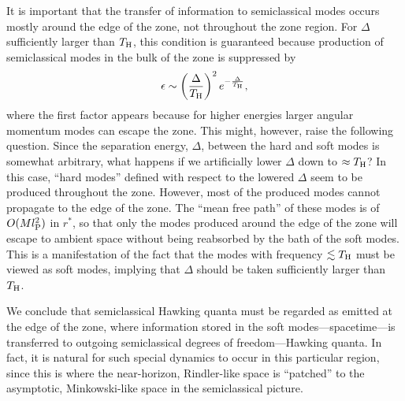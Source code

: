 \documentclass[12pt]{article}
\begin{document}
It is important that the transfer of information to semiclassical 
modes occurs mostly around the edge of the zone, not throughout the 
zone region.  For $\Delta$ sufficiently larger than $T_{\rm H}$, 
this condition is guaranteed because production of semiclassical 
modes in the bulk of the zone is suppressed by
%
\begin{equation}
  \epsilon \sim \biggl( \frac{\Delta}{T_{\rm H}} \biggr)^2 
    \, e^{-\frac{\Delta}{T_{\rm H}}},
\label{eq:suppress}
\end{equation}
%
where the first factor appears because for higher energies larger 
angular momentum modes can escape the zone.  This might, however, 
raise the following question.  Since the separation energy, 
$\Delta$, between the hard and soft modes is somewhat arbitrary, 
what happens if we artificially lower $\Delta$ down to $\approx 
T_{\rm H}$?  In this case, ``hard modes'' defined with respect 
to the lowered $\Delta$ seem to be produced throughout the zone. 
However, most of the produced modes cannot propagate to the 
edge of the zone.  The ``mean free path'' of these modes is 
of $O(M l_{\rm P}^2)$ in $r^*$, so that only the modes produced 
around the edge of the zone will escape to ambient space 
without being reabsorbed by the bath of the soft modes.  This 
is a manifestation of the fact that the modes with frequency 
$\lesssim T_{\rm H}$ must be viewed as soft modes, implying that 
$\Delta$ should be taken sufficiently larger than $T_{\rm H}$.

We conclude that semiclassical Hawking quanta must be regarded 
as emitted at the edge of the zone, where information stored 
in the soft modes---spacetime---is transferred to outgoing 
semiclassical degrees of freedom---Hawking quanta.  In fact, 
it is natural for such special dynamics to occur in this particular 
region, since this is where the near-horizon, Rindler-like space 
is ``patched'' to the asymptotic, Minkowski-like space in the 
semiclassical picture.
\end{document}

